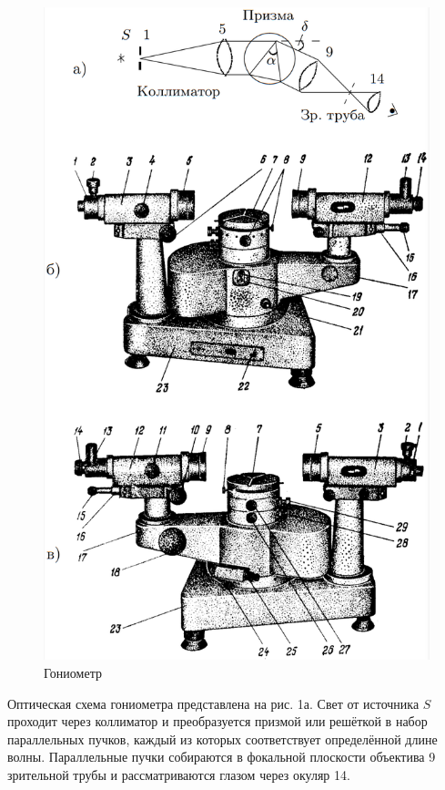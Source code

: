\documentclass[a4paper,12pt]{article} %
\begin{document}
	\begin{figure}[h!]
		\centering
		\includegraphics[scale=0.65]{Pictures/Установка}
		\caption{Гониометр}
	\end{figure}

	Оптическая схема гониометра представлена на рис. 1а. Свет от источника $S$ проходит через коллиматор и преобразуется призмой или решёткой в набор параллельных пучков, каждый из которых соответствует определённой длине волны. Параллельные пучки собираются в фокальной плоскости объектива 9 зрительной трубы и рассматриваются глазом через окуляр 14.
	
\end{document}
